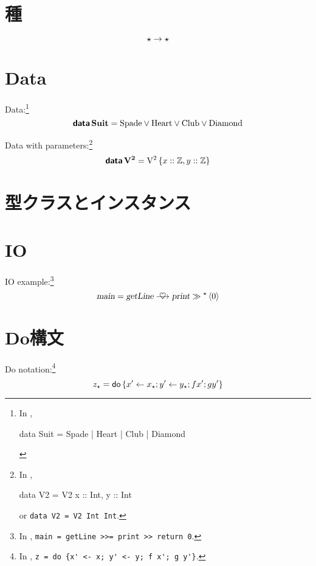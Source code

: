 \documentclass[platex,a5paper,twoside,fleqn,draft]{jsbook}
\begin{document}
\section{種}

\begin{equation}
\star\rightarrow\star
\end{equation}

\section{Data}

Data:\footnote{In \haskell,
\begin{footcode}
data Suit = Spade | Heart | Club | Diamond
\end{footcode}}
\begin{equation}
\mathop{\textbf{\textsf{data}}}\mathbf{Suit}=\mathord{\mathrm{Spade}}\vee\mathord{\mathrm{Heart}}\vee\mathord{\mathrm{Club}}\vee\mathord{\mathrm{Diamond}}
\end{equation}

Data with parameters:\footnote{In \haskell,
\begin{footcode}
data V2 = V2 { x :: Int, y :: Int}
\end{footcode}
or \verb|data V2 = V2 Int Int|.}
\begin{equation}
\mathop{\textbf{\textsf{data}}}\mathbf{V^2}=\mathord{\mathrm{V^2}}\left\{x::\mathord{\mathbb{Z}},y::\mathord{\mathbb{Z}}\right\}
\end{equation}

\section{型クラスとインスタンス}

\section{IO}

IO example:\footnote{In \haskell, \verb|main = getLine >>= print >> return 0|.}
\begin{equation}
\mathMain=\mathGetLine\mathBindRight\mathPrint\mathNext\mathMakeReturn{0}
\end{equation}

\section{Do構文}

Do notation:\footnote{In \haskell, \verb|z = do {x' <- x; y' <- y; f x'; g y'}|.}
\begin{equation}
z_\star=\mathord{\textsf{do}}\left\{x'\leftarrow x_\star;y'\leftarrow y_\star;fx';gy'\right\}
\end{equation}
\end{document}
